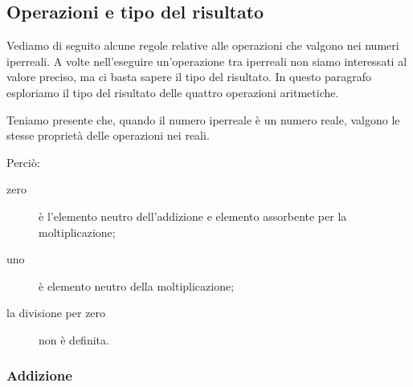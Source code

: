 \vspace{-5mm}

\subsection{Operazioni e tipo del risultato}
\label{subsec:insnum_operazioni}

Vediamo di seguito alcune regole relative alle operazioni 
che valgono nei numeri iperreali. 
A volte nell'eseguire un'operazione tra iperreali 
non siamo interessati al valore preciso, ma 
ci basta sapere il tipo del risultato. 
In questo paragrafo esploriamo il tipo del risultato delle quattro 
operazioni aritmetiche.

Teniamo presente che, quando il numero iperreale è un numero reale, 
valgono le stesse proprietà delle operazioni nei reali.

Perciò: 
\begin{description} %
\item [zero] è l'elemento neutro dell'addizione e 
elemento assorbente per la moltiplicazione;
\item [uno] è elemento neutro della moltiplicazione;
\item [la divisione per zero] non è definita.
\end{description}


\bigskip %
\newpage %

\subsubsection{Addizione}
\label{subsec:insnum_addizione}

